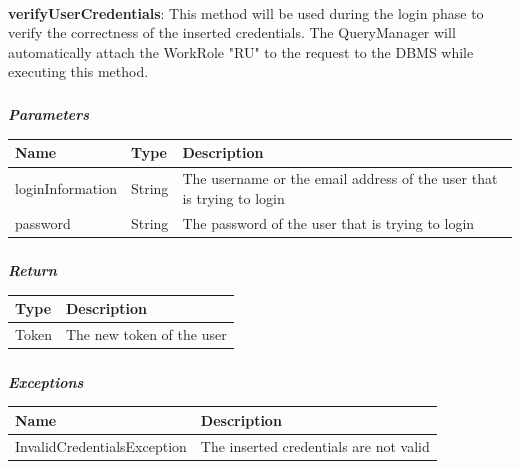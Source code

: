 					\paragraph{}
					\vspace{-2mm}
							\textbf{verifyUserCredentials}: This method will be used during the login phase to verify the correctness of the inserted credentials. The QueryManager will automatically attach the WorkRole "RU" to the request to the DBMS while executing this method.
							\subparagraph{}
							\vspace{-3mm}
							\textit{\textbf{Parameters}}
							\vspace{-2mm}
								\begin{table}[!h]
									\begin{tabular}{L{0.2\textwidth}L{0.15\textwidth}L{0.45\textwidth}}
										\toprule
										\textbf{Name} & \textbf{Type} & \textbf{Description} \\
										\midrule
								  		loginInformation & String & The username or the email address of the user that is trying to login \\
								  		password & String & The password of the user that is trying to login \\
								 		\bottomrule
									\end{tabular}
								\end{table}
							\vspace{-6mm}
							\subparagraph{}
								\textit{\textbf{Return}}
								\vspace{-2mm}
									\begin{table}[!h]
									\begin{tabular}{ll}
										\toprule
										\textbf{Type} & \textbf{Description} \\
										\midrule
								  		Token & The new token of the user \\
								 		\bottomrule
									\end{tabular}
								\end{table}
							\vspace{-6mm}
							\subparagraph{}
								\textit{\textbf{Exceptions}}
								\vspace{-2mm}
									\begin{table}[!h]
									\begin{tabular}{ll}
										\toprule
										\textbf{Name} & \textbf{Description} \\
										\midrule
								  		InvalidCredentialsException & The inserted credentials are not valid \\ 
								 		\bottomrule
									\end{tabular}
								\end{table}
								
